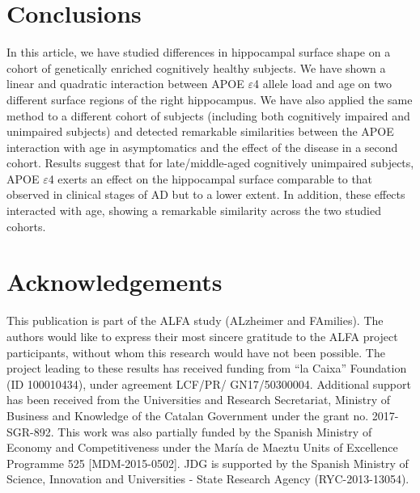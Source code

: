 \section{Conclusions}
\label{sec:conclusions}

In this article, we have studied differences in hippocampal surface shape on a cohort of genetically enriched cognitively healthy subjects. We have shown a linear and quadratic interaction between APOE $\varepsilon$4 allele load and age on two different surface regions of the right hippocampus. We have also applied the same method to a different cohort of subjects (including both cognitively impaired and unimpaired subjects) and detected remarkable similarities between the APOE interaction with age in asymptomatics and the effect of the disease in a second cohort. Results suggest that for late/middle-aged cognitively unimpaired subjects, APOE $\varepsilon$4 exerts an effect on the hippocampal surface comparable to that observed in clinical stages of AD but to a lower extent. In addition, these effects interacted with age, showing a remarkable similarity across the two studied cohorts. \\

\section*{Acknowledgements}
This publication is part of the ALFA study (ALzheimer and FAmilies). The authors would like to express their most sincere gratitude to the ALFA project participants, without whom this research would have not been possible. The project leading to these results has received funding from “la Caixa” Foundation (ID 100010434), under agreement LCF/PR/ GN17/50300004. Additional support has been received from the Universities and Research Secretariat, Ministry of Business and Knowledge of the Catalan Government under the grant no. 2017-SGR-892. This work was also partially funded by the Spanish Ministry of Economy and Competitiveness under the María de Maeztu Units of Excellence Programme 525 [MDM-2015-0502]. JDG is supported by the Spanish Ministry of Science, Innovation and Universities - State Research Agency (RYC-2013-13054). \\

